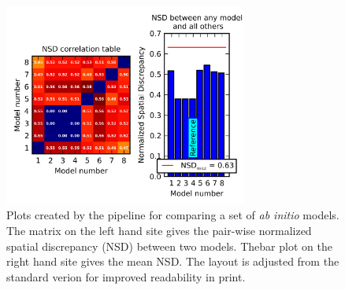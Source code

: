 \documentclass[preprint,pdf]{iucr}              %
\begin{document}
% 
% 
% 
% 
% 
% 

\begin{figure}
\centering
\includegraphics[width=8cm]{nsd.png}%
\caption{Plots created by the pipeline for comparing a set of \textit{ab initio} models. The matrix on the left hand site gives the pair-wise normalized spatial discrepancy (NSD) between two models. Thebar plot on the right hand site gives the mean NSD. The layout is adjusted from the standard verion for improved readability in print.}
\label{fgr:nsd}
\end{figure}
\end{document}
